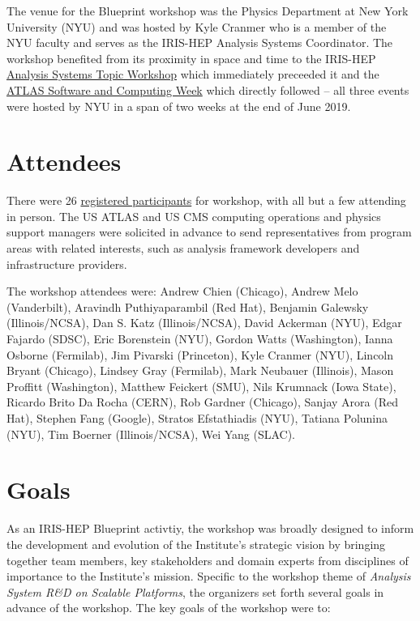 \documentclass[11pt,letterpaper,fleqn]{article}
\begin{document}
The venue for the Blueprint workshop was the Physics Department at New York University (NYU) and was hosted by Kyle Cranmer who is a member of the NYU faculty and serves as the IRIS-HEP Analysis Systems Coordinator. The workshop benefited from its proximity in space and time to the IRIS-HEP \href{https://indico.cern.ch/event/822074/}{Analysis Systems Topic Workshop} which immediately preceeded it and the \href{https://indico.cern.ch/event/765245/}{ATLAS Software and Computing Week} which directly followed -- all three events were hosted by NYU in a span of two weeks at the end of June 2019.

\section{Attendees}
\vspace{0.2cm}
There were 26 \href{https://indico.cern.ch/event/820946/registrations/participants}{registered participants} for workshop, with all but a few attending in person. The US ATLAS and US CMS computing operations and physics support managers were solicited in advance to send representatives from program areas with related interests, such as analysis framework developers and infrastructure providers.

The workshop attendees were:
Andrew Chien (Chicago),
Andrew Melo (Vanderbilt),
Aravindh Puthiyaparambil (Red Hat),
Benjamin Galewsky (Illinois/NCSA),
Dan S. Katz (Illinois/NCSA),
David Ackerman (NYU),
Edgar Fajardo (SDSC),
Eric Borenstein (NYU),
Gordon Watts (Washington),
Ianna Osborne (Fermilab),
Jim Pivarski (Princeton),
Kyle Cranmer (NYU),
Lincoln Bryant (Chicago),
Lindsey Gray (Fermilab),
Mark Neubauer (Illinois),
Mason Proffitt (Washington),
Matthew Feickert (SMU),
Nils Krumnack (Iowa State),
Ricardo Brito Da Rocha (CERN),
Rob Gardner (Chicago),
Sanjay Arora (Red Hat),
Stephen Fang (Google),
Stratos Efstathiadis (NYU),
Tatiana Polunina (NYU),
Tim Boerner (Illinois/NCSA),
Wei Yang (SLAC).

\section{Goals}
\label{sec:Goals}
\vspace{0.2cm}
As an IRIS-HEP Blueprint activtiy, the workshop was broadly designed to inform the development and evolution of the Institute’s strategic vision by bringing together team members, key stakeholders and domain experts from disciplines of importance to the Institute's mission. Specific to the workshop theme of \textit{Analysis System R\&D on Scalable Platforms}, the organizers set forth several goals in advance of the workshop. The key goals of the workshop were to:
\end{document}
